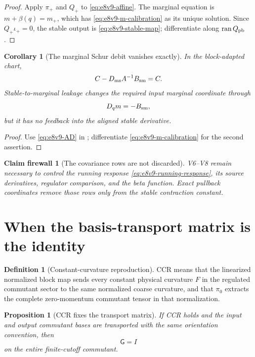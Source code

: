 \documentclass[11pt,oneside]{book}
\newtheorem{proposition}[theorem]{Proposition}
\newtheorem{corollary}[theorem]{Corollary}
\newtheorem{firewall}[theorem]{Claim firewall}
\theoremstyle{definition}
\newtheorem{definition}[theorem]{Definition}
\theoremstyle{remark}
\begin{document}
\begin{proof}
Apply \(\pi_+\) and \(Q_+\) to
\eqref{eq:e8v9-affine}.  The marginal equation is
\(m+\beta(q)=m_+\), which has
\eqref{eq:e8v9-m-calibration} as its unique solution.  Since
\(Q_+\iota_+=0\), the stable output is
\eqref{eq:e8v9-stable-map}; differentiate along
\(\operatorname{ran}Q_{\rm pb}\).
\end{proof}

\begin{corollary}[The marginal Schur debit vanishes exactly]
\label{cor:e8v9-Schur-zero}
In the block-adapted chart,
\[
 C-D_{\rm ms}A^{-1}B_{\rm sm}=C.                   \label{eq:e8v9-Schur-zero}
\]
Stable-to-marginal leakage changes the required input marginal
coordinate through
\[
 D_qm=-B_{\rm sm},                                  \label{eq:e8v9-running-response}
\]
but it has no feedback into the aligned stable derivative.
\end{corollary}

\begin{proof}
Use \eqref{eq:e8v9-AD} in
; differentiate
\eqref{eq:e8v9-m-calibration} for the second assertion.
\end{proof}

\begin{firewall}[The covariance rows are not discarded]
\label{fire:e8v9-covariance}
V6--V8 remain necessary to control the running response
\eqref{eq:e8v9-running-response}, its source derivatives, regulator
comparison, and the beta function.  Exact pullback coordinates remove
those rows only from the stable contraction constant.
\end{firewall}

\section{When the basis-transport matrix is the identity}
\label{sec:e8v9-reproduction}

\begin{definition}[Constant-curvature reproduction]
\label{def:e8v9-CCR}
CCR means that the linearized normalized block map sends every
constant physical curvature \(F\) in the regulated commutant sector
to the same normalized coarse curvature, and that \(\pi_0\) extracts
the complete zero-momentum commutant tensor in that normalization.
\end{definition}

\begin{proposition}[CCR fixes the transport matrix]
\label{prop:e8v9-G-identity}
If CCR holds and the input and output commutant bases are transported
with the same orientation convention, then
\[
 {\mathsf G}=I                                      \label{eq:e8v9-G-identity}
\]
on the entire finite-cutoff commutant.
\end{proposition}
\end{document}
